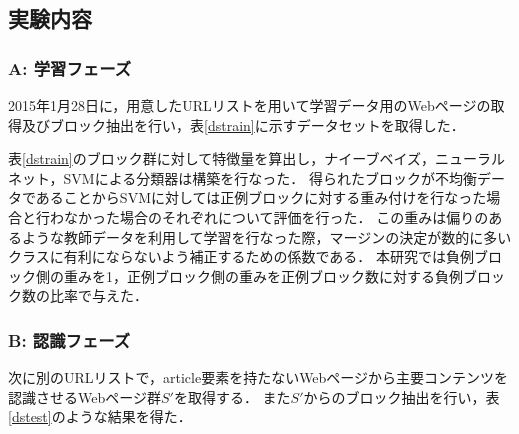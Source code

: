 \documentclass[a4paper,10pt,twocolumn]{jsarticle}
\begin{document}
\subsection{実験内容}

\subsubsection*{A: 学習フェーズ}

2015年1月28日に，用意したURLリストを用いて学習データ用のWebページの取得及びブロック抽出を行い，表\ref{dstrain}に示すデータセットを取得した．

\begin{table}[htbp]
\begin{center}
\caption{学習用Webページ(artcile要素あり)のデータセット概要}\label{dstrain}
\end{center}
\end{table}

表\ref{dstrain}のブロック群に対して特徴量を算出し，ナイーブベイズ，ニューラルネット，SVMによる分類器は構築を行なった．
得られたブロックが不均衡データであることからSVMに対しては正例ブロックに対する重み付けを行なった場合と行わなかった場合のそれぞれについて評価を行った．
この重みは偏りのあるような教師データを利用して学習を行なった際，マージンの決定が数的に多いクラスに有利にならないよう補正するための係数である．
本研究では負例ブロック側の重みを1，正例ブロック側の重みを正例ブロック数に対する負例ブロック数の比率で与えた．

\subsubsection*{B: 認識フェーズ}

次に別のURLリストで，article要素を持たないWebページから主要コンテンツを認識させるWebページ群$S'$を取得する．
また$S'$からのブロック抽出を行い，表\ref{dstest}のような結果を得た．

\begin{table}[htbp]
\begin{center}
\caption{認識用Webページ(artcile要素なし)のデータセット概要}\label{dstest}
\end{center}
\end{table}
\end{document}
